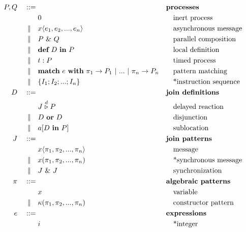 \begin{figure}
\newcommand{\alt}{\mid\kern-1pt\mid}
\begin{align*}
P,Q\quad::={}&             && \textbf{processes} \\
          & 0              && \quad\textrm{inert process} \\
 \alt\quad& x\langle e_1, e_2, ..., e_n \rangle
                           && \quad\textrm{asynchronous message} \\
 \alt\quad& P~\&~Q         && \quad\textrm{parallel composition} \\
 \alt\quad& \textbf{def}~D~\textbf{in}~P
                           && \quad\textrm{local definition} \\
 \alt\quad& t : P          && \quad\textrm{timed process} \\
 \alt\quad& \textbf{match}~e~\textbf{with}~\pi_1
               \rightarrow P_1 ~|~ ... ~|~ \pi_n \rightarrow P_n
                           && \quad\textrm{pattern matching} \\
 \alt\quad& \{ I_1; I_2; ...; I_n \}
                           && \quad\textrm{*instruction sequence} \\
D\quad ::={}&              && \textbf{join definitions} \\
         & J \stackrel{d}{\triangleright} P
                           && \quad\textrm{delayed reaction} \\
\alt\quad& D~\textbf{or}~D && \quad\textrm{disjunction} \\
\alt\quad& a[D~\textbf{in}~P] && \quad\textrm{sublocation} \\
J\quad ::={}&              && \textbf{join patterns}\\
         & x\langle \pi_1, \pi_2, ..., \pi_n \rangle
                           && \quad\textrm{message} \\
\alt\quad& x(\pi_1, \pi_2, ..., \pi_n)
                           && \quad\textrm{*synchronous message} \\
\alt\quad& J~\&~J          && \quad\textrm{synchronization} \\
\pi\quad ::={}&            && \textbf{algebraic patterns} \\
         & x               && \quad\textrm{variable} \\
\alt\quad& \kappa(\pi_1, \pi_2, ..., \pi_n)
                           && \quad\textrm{constructor pattern} \\
e\quad ::={}&              && \textbf{expressions} \\
         & i               && \quad\textrm{*integer} \\

\end{align*}
\end{figure}
